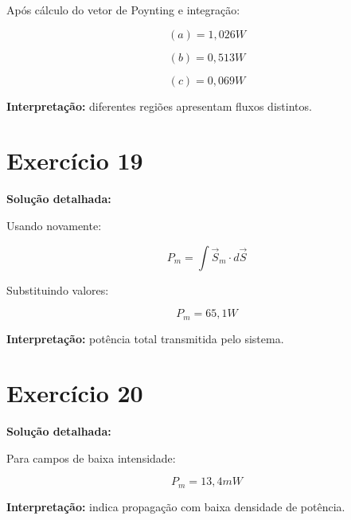 \documentclass[12pt,a4paper]{article}
\begin{document}
Após cálculo do vetor de Poynting e integração:

\[
(a) = 1{,}026 W
\]

\[
(b) = 0{,}513 W
\]

\[
(c) = 0{,}069 W
\]

\textbf{Interpretação:} diferentes regiões apresentam fluxos distintos.

\newpage

\section*{Exercício 19}

\textbf{Solução detalhada:}

Usando novamente:

\[
P_m = \int \vec{S}_m \cdot d\vec{S}
\]

Substituindo valores:

\[
P_m = 65{,}1 W
\]

\textbf{Interpretação:} potência total transmitida pelo sistema.

\newpage

\section*{Exercício 20}

\textbf{Solução detalhada:}

Para campos de baixa intensidade:

\[
P_m = 13{,}4 mW
\]

\textbf{Interpretação:} indica propagação com baixa densidade de potência.
\end{document}
